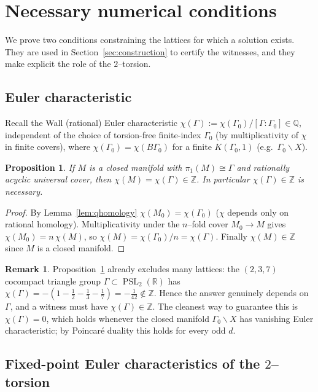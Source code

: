 \documentclass[12pt]{article}
\newcommand{\bR}{\mathbb{R}}
\newcommand{\bQ}{\mathbb{Q}}
\newcommand{\bZ}{\mathbb{Z}}
\DeclareMathOperator{\PSL}{PSL}
\newtheorem{proposition}{Proposition}
\theoremstyle{definition}
\newtheorem{remark}{Remark}
\begin{document}
\section{Necessary numerical conditions}\label{sec:necessary}

We prove two conditions constraining the lattices for which a solution exists.
They are used in Section~\ref{sec:construction} to certify the witnesses, and they
make explicit the role of the $2$--torsion.

\subsection{Euler characteristic}

Recall the Wall (rational) Euler characteristic
$\chi(\Gamma):=\chi(\Gamma_0)/[\Gamma:\Gamma_0]\in\bQ$, independent of the choice
of torsion-free finite-index $\Gamma_0$ (by multiplicativity of $\chi$ in finite
covers), where $\chi(\Gamma_0)=\chi(B\Gamma_0)$ for a finite $K(\Gamma_0,1)$
(e.g.\ $\Gamma_0\backslash X$).

\begin{proposition}\label{prop:euler}
If $M$ is a closed manifold with $\pi_1(M)\cong\Gamma$ and rationally acyclic
universal cover, then $\chi(M)=\chi(\Gamma)\in\bZ$.  In particular
$\chi(\Gamma)\in\bZ$ is necessary.
\end{proposition}

\begin{proof}
By Lemma~\ref{lem:qhomology} $\chi(M_0)=\chi(\Gamma_0)$ ($\chi$ depends only on
rational homology).  Multiplicativity under the $n$--fold cover $M_0\to M$ gives
$\chi(M_0)=n\,\chi(M)$, so $\chi(M)=\chi(\Gamma_0)/n=\chi(\Gamma)$.  Finally
$\chi(M)\in\bZ$ since $M$ is a closed manifold.
\end{proof}

\begin{remark}\label{rem:triangle}
Proposition~\ref{prop:euler} already excludes many lattices: the $(2,3,7)$
cocompact triangle group $\Gamma\subset\PSL_2(\bR)$ has
$\chi(\Gamma)=-(1-\tfrac12-\tfrac13-\tfrac17)=-\tfrac1{42}\notin\bZ$.  Hence the
answer genuinely depends on $\Gamma$, and a witness must have $\chi(\Gamma)\in\bZ$.
The cleanest way to guarantee this is $\chi(\Gamma)=0$, which holds whenever the
closed manifold $\Gamma_0\backslash X$ has vanishing Euler characteristic; by
Poincar\'e duality this holds for every odd $d$.
\end{remark}

\subsection{Fixed-point Euler characteristics of the $2$--torsion}
\end{document}
